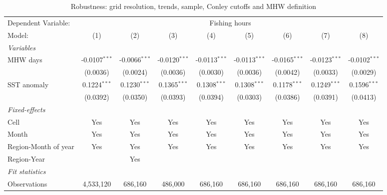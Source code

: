 
\begin{table}[htbp]
   \caption{\label{tab:rob} Robustness: grid resolution, trends, sample, Conley cutoffs and MHW definition}
   \centering
   \begin{tabular}{lcccccccc}
      \tabularnewline \midrule \midrule
      Dependent Variable: & \multicolumn{8}{c}{Fishing hours}\\
      Model:               & (1)             & (2)             & (3)             & (4)             & (5)             & (6)             & (7)             & (8)\\  
      \midrule
      \emph{Variables}\\
      MHW days             & -0.0107$^{***}$ & -0.0066$^{***}$ & -0.0120$^{***}$ & -0.0113$^{***}$ & -0.0113$^{***}$ & -0.0165$^{***}$ & -0.0123$^{***}$ & -0.0102$^{***}$\\   
                           & (0.0036)        & (0.0024)        & (0.0036)        & (0.0030)        & (0.0036)        & (0.0042)        & (0.0033)        & (0.0029)\\   
      SST anomaly          & 0.1224$^{***}$  & 0.1230$^{***}$  & 0.1365$^{***}$  & 0.1308$^{***}$  & 0.1308$^{***}$  & 0.1178$^{***}$  & 0.1249$^{***}$  & 0.1596$^{***}$\\   
                           & (0.0392)        & (0.0350)        & (0.0393)        & (0.0394)        & (0.0303)        & (0.0386)        & (0.0391)        & (0.0413)\\   
      \midrule
      \emph{Fixed-effects}\\
      Cell                 & Yes             & Yes             & Yes             & Yes             & Yes             & Yes             & Yes             & Yes\\  
      Month                & Yes             & Yes             & Yes             & Yes             & Yes             & Yes             & Yes             & Yes\\  
      Region-Month of year & Yes             & Yes             & Yes             & Yes             & Yes             & Yes             & Yes             & Yes\\  
      Region-Year          &                 & Yes             &                 &                 &                 &                 &                 & \\  
      \midrule
      \emph{Fit statistics}\\
      Observations         & 4,533,120       & 686,160         & 486,000         & 686,160         & 686,160         & 686,160         & 686,160         & 686,160\\  

\end{tabular}
\end{table}
